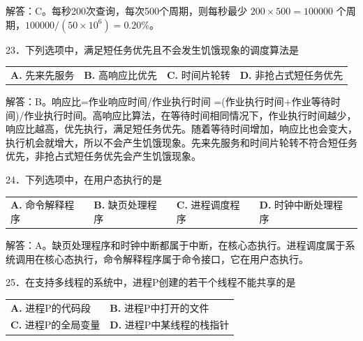 \documentclass[UTF8,11pt]{ctexart}
\begin{document}
解答：C。每秒200次查询，每次500个周期，则每秒最少 \(\displaystyle 200\times500=100000\) 个周期，\(\displaystyle 100000/(50\times10^6)=0.20\%\)。


23．下列选项中，满足短任务优先且不会发生饥饿现象的调度算法是


\begin{center}\begin{tabular}{>{\raggedright\arraybackslash}p{\dimexpr(\linewidth-8\tabcolsep)/4\relax}>{\raggedright\arraybackslash}p{\dimexpr(\linewidth-8\tabcolsep)/4\relax}>{\raggedright\arraybackslash}p{\dimexpr(\linewidth-8\tabcolsep)/4\relax}>{\raggedright\arraybackslash}p{\dimexpr(\linewidth-8\tabcolsep)/4\relax}}
\textbf{A.} 先来先服务 & \textbf{B.} 高响应比优先 & \textbf{C.} 时间片轮转 & \textbf{D.} 非抢占式短任务优先\\[.35em]\end{tabular}\end{center}

解答：B。响应比=作业响应时间/作业执行时间 =(作业执行时间+作业等待时间)/作业执行时间。高响应比算法，在等待时间相同情况下，作业执行时间越少，响应比越高，优先执行，满足短任务优先。随着等待时间增加，响应比也会变大，执行机会就增大，所以不会产生饥饿现象。先来先服务和时间片轮转不符合短任务优先，非抢占式短任务优先会产生饥饿现象。


24．下列选项中，在用户态执行的是


\begin{center}\begin{tabular}{>{\raggedright\arraybackslash}p{\dimexpr(\linewidth-8\tabcolsep)/4\relax}>{\raggedright\arraybackslash}p{\dimexpr(\linewidth-8\tabcolsep)/4\relax}>{\raggedright\arraybackslash}p{\dimexpr(\linewidth-8\tabcolsep)/4\relax}>{\raggedright\arraybackslash}p{\dimexpr(\linewidth-8\tabcolsep)/4\relax}}
\textbf{A.} 命令解释程序 & \textbf{B.} 缺页处理程序 & \textbf{C.} 进程调度程序 & \textbf{D.} 时钟中断处理程序\\[.35em]\end{tabular}\end{center}

解答：A。缺页处理程序和时钟中断都属于中断，在核心态执行。进程调度属于系统调用在核心态执行，命令解释程序属于命令接口，它在用户态执行。


25．在支持多线程的系统中，进程P创建的若干个线程不能共享的是


\begin{center}\begin{tabular}{>{\raggedright\arraybackslash}p{\dimexpr(\linewidth-4\tabcolsep)/2\relax}>{\raggedright\arraybackslash}p{\dimexpr(\linewidth-4\tabcolsep)/2\relax}}
\textbf{A.} 进程P的代码段 & \textbf{B.} 进程P中打开的文件\\[.35em]
\textbf{C.} 进程P的全局变量 & \textbf{D.} 进程P中某线程的栈指针\\[.35em]\end{tabular}\end{center}
\end{document}
